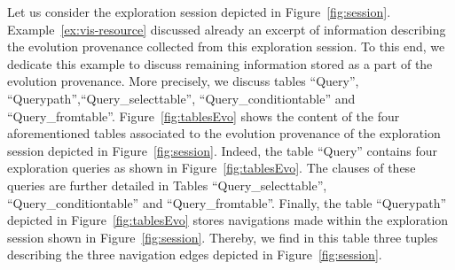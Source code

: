 	

\begin{example}
\label{exm1}
Let us consider the exploration session depicted in Figure~\ref{fig:session}.  Example~\ref{ex:vis-resource} discussed already an excerpt of information describing the evolution provenance collected from this exploration session. 
To this end, we dedicate this example to discuss remaining information stored as a part of the evolution provenance. More precisely, we discuss tables ``Query'', ``Querypath'',``Query\_selecttable'', ``Query\_conditiontable'' and ``Query\_fromtable''.
Figure~\ref{fig:tablesEvo} shows the content of the four aforementioned tables associated to the evolution provenance of the exploration session depicted in Figure~\ref{fig:session}. 
Indeed, the table ``Query'' contains four exploration queries as shown in Figure~\ref{fig:tablesEvo}.
The clauses of these queries are further detailed in Tables ``Query\_selecttable'', ``Query\_conditiontable'' and ``Query\_fromtable''. Finally, the table ``Querypath'' depicted in Figure~\ref{fig:tablesEvo} stores navigations made within the exploration session shown in Figure~\ref{fig:session}. Thereby, we find in this table three tuples describing the three navigation edges depicted in Figure~\ref{fig:session}.
 \end{example}